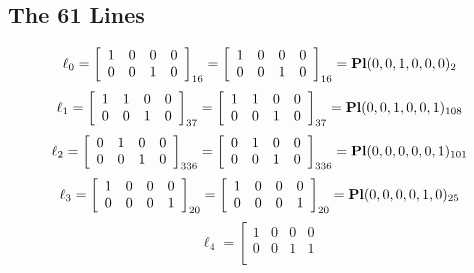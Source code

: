 \documentclass{article}
\begin{document}
{\subsection*{The 61 Lines}
$$
\ell_{0} = 
\left[
\begin{array}{*{4}{r}}
1 & 0 & 0 & 0\\
0 & 0 & 1 & 0\\
\end{array}
\right]
_{16}
=
\left[
\begin{array}{*{4}c}
1  & 0  & 0  & 0\\
0  & 0  & 1  & 0\\
\end{array}
\right]_{16}
={\rm\bf Pl}(0,0,1,0,0,0 )_{2}$$
$$
\ell_{1} = 
\left[
\begin{array}{*{4}{r}}
1 & 1 & 0 & 0\\
0 & 0 & 1 & 0\\
\end{array}
\right]
_{37}
=
\left[
\begin{array}{*{4}c}
1  & 1  & 0  & 0\\
0  & 0  & 1  & 0\\
\end{array}
\right]_{37}
={\rm\bf Pl}(0,0,1,0,0,1 )_{108}$$
$$
\ell_{2} = 
\left[
\begin{array}{*{4}{r}}
0 & 1 & 0 & 0\\
0 & 0 & 1 & 0\\
\end{array}
\right]
_{336}
=
\left[
\begin{array}{*{4}c}
0  & 1  & 0  & 0\\
0  & 0  & 1  & 0\\
\end{array}
\right]_{336}
={\rm\bf Pl}(0,0,0,0,0,1 )_{101}$$
$$
\ell_{3} = 
\left[
\begin{array}{*{4}{r}}
1 & 0 & 0 & 0\\
0 & 0 & 0 & 1\\
\end{array}
\right]
_{20}
=
\left[
\begin{array}{*{4}c}
1  & 0  & 0  & 0\\
0  & 0  & 0  & 1\\
\end{array}
\right]_{20}
={\rm\bf Pl}(0,0,0,0,1,0 )_{25}$$
$$
\ell_{4} = 
\left[
\begin{array}{*{4}{r}}
1 & 0 & 0 & 0\\
0 & 0 & 1 & 1\\
\end{array}
$$}
\end{document}
